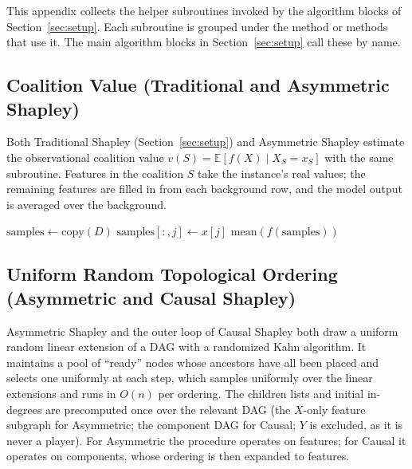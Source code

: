\documentclass[12pt,a4paper,oneside]{article}
\begin{document}
This appendix collects the helper subroutines invoked by the algorithm blocks of Section~\ref{sec:setup}. Each subroutine is grouped under the method or methods that use it. The main algorithm blocks in Section~\ref{sec:setup} call these by name.

\subsection{Coalition Value (Traditional and Asymmetric Shapley)}

Both Traditional Shapley (Section~\ref{sec:setup}) and Asymmetric Shapley estimate the observational coalition value $v(S) = \mathbb{E}[f(X) \mid X_S = x_S]$ with the same subroutine. Features in the coalition $S$ take the instance's real values; the remaining features are filled in from each background row, and the model output is averaged over the background.

\begin{algorithm}[H]
  \caption{COALITION\_VALUE --- $v(S) = \mathbb{E}[f(X) \mid X_S = x_S]$}
  \label{alg:coalition_value}
  \begin{algorithmic}[1]
      \State $\text{samples} \gets \text{copy}(D)$  
        \State $\text{samples}[:,j] \gets x[j]$  
      \EndFor
      \Return $\text{mean}(f(\text{samples}))$  
    \EndFunction
  \end{algorithmic}
\end{algorithm}

\subsection{Uniform Random Topological Ordering (Asymmetric and Causal Shapley)}

Asymmetric Shapley and the outer loop of Causal Shapley both draw a uniform random linear extension of a DAG with a randomized Kahn algorithm. It maintains a pool of ``ready'' nodes whose ancestors have all been placed and selects one uniformly at each step, which samples uniformly over the linear extensions and runs in $O(n)$ per ordering. The children lists and initial in-degrees are precomputed once over the relevant DAG (the $X$-only feature subgraph for Asymmetric; the component DAG for Causal; $Y$ is excluded, as it is never a player). For Asymmetric the procedure operates on features; for Causal it operates on components, whose ordering is then expanded to features.
\end{document}
